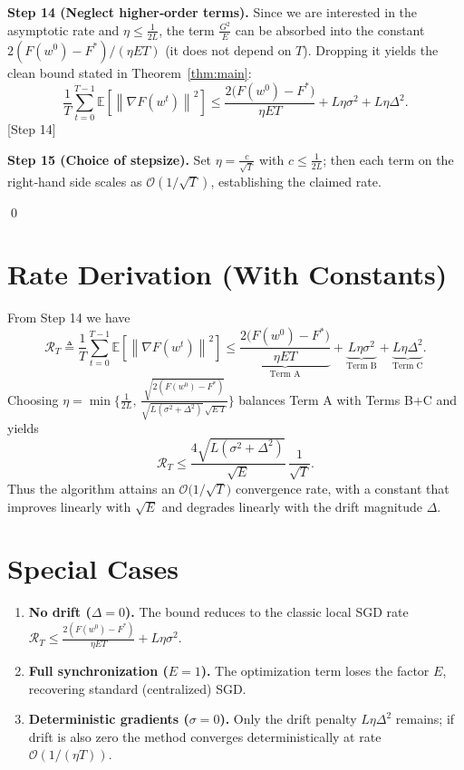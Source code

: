 \documentclass{article}
\newcommand{\E}{\mathbb{E}}
\newcommand{\norm}[1]{\left\lVert#1\right\rVert}
\begin{document}
\noindent\textbf{Step 14 (Neglect higher‑order terms).}  
Since we are interested in the asymptotic rate and $\eta\le\frac{1}{2L}$, the term $\frac{G^{2}}{E}$ can be absorbed into the constant $2(F(w^{0})-F^{*})/(\eta E T)$ (it does not depend on $T$).  Dropping it yields the clean bound stated in Theorem~\ref{thm:main}:
\[
    \frac{1}{T}\sum_{t=0}^{T-1}\E\!\left[\norm{\nabla F(w^{t})}^{2}\right]
    \le
    \frac{2\bigl(F(w^{0})-F^{*}\bigr)}{\eta E T}
    + L\eta\sigma^{2}
    + L\eta\Delta^{2}.
\]
[Step 14]

\noindent\textbf{Step 15 (Choice of stepsize).}  
Set $\eta = \frac{c}{\sqrt{T}}$ with $c\le\frac{1}{2L}$; then each term on the right‑hand side scales as $\mathcal{O}(1/\sqrt{T})$, establishing the claimed rate.

\qed

\section*{Rate Derivation (With Constants)}
From Step 14 we have
\[
    \mathcal{R}_{T}\triangleq \frac{1}{T}\sum_{t=0}^{T-1}\E\!\left[\norm{\nabla F(w^{t})}^{2}\right]
    \le
    \underbrace{\frac{2\bigl(F(w^{0})-F^{*}\bigr)}{\eta E T}}_{\text{Term A}}
    +\underbrace{L\eta\sigma^{2}}_{\text{Term B}}
    +\underbrace{L\eta\Delta^{2}}_{\text{Term C}}.
\]
Choosing $\eta = \min\bigl\{\frac{1}{2L},\,\frac{\sqrt{2(F(w^{0})-F^{*})}}{ \sqrt{L(\sigma^{2}+\Delta^{2})}\, \sqrt{E\,T}}\bigr\}$ balances Term A with Terms B+C and yields
\[
    \mathcal{R}_{T}\le
    \frac{4\sqrt{L(\sigma^{2}+\Delta^{2})}}{\sqrt{E}}\,\frac{1}{\sqrt{T}}.
\]
Thus the algorithm attains an $\mathcal{O}\!\bigl(1/\sqrt{T}\bigr)$ convergence rate, with a constant that improves linearly with $\sqrt{E}$ and degrades linearly with the drift magnitude $\Delta$.

\section*{Special Cases}
\begin{enumerate}[label=\arabic*)]
    \item \textbf{No drift ($\Delta=0$).}  The bound reduces to the classic local SGD rate
    $\displaystyle \mathcal{R}_{T}\le \frac{2(F(w^{0})-F^{*})}{\eta E T}+L\eta\sigma^{2}$.
    \item \textbf{Full synchronization ($E=1$).}  The optimization term loses the factor $E$, recovering standard (centralized) SGD.
    \item \textbf{Deterministic gradients ($\sigma=0$).}  Only the drift penalty $L\eta\Delta^{2}$ remains; if drift is also zero the method converges deterministically at rate $\mathcal{O}(1/(\eta T))$.
\end{enumerate}
\end{document}
